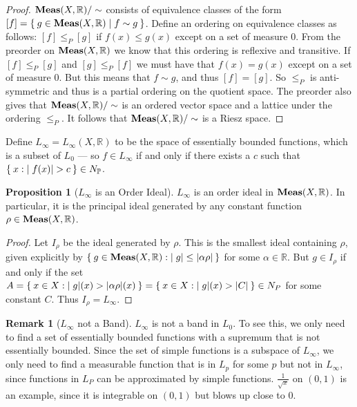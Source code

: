 \documentclass[letterpaper,10pt,oneside,onecolumn,reqno]{amsart}
\renewcommand{\P}{\mathbb P}
\newcommand{\R}{\mathbb R}
\theoremstyle{definition}
\newtheorem{pro}[thm]{Proposition}
\newtheorem{rem}{Remark}
\newcommand{\catname}[1]{{\normalfont\textbf{#1}}}
\newcommand{\Meas}{\catname{Meas}}
\begin{document}
\begin{proof}
  $\Meas(X, \R)/\sim$ consists of equivalence classes of the form $[f]
  = \Set{g \in \Meas(X, \R) | f \sim g }$. Define an ordering on
  equivalence classes as follows: $[f] \leq_P [g]$ if $f(x) \leq g(x)$
  except on a set of measure $0$. From the preorder on $\Meas(X,\R)$
  we know that this ordering is reflexive and transitive.  If $[f]
  \leq_P [g]$ and $[g] \leq_P [f]$ we must have that $f(x) = g(x)$
  except on a set of measure $0$. But this means that $f \sim g$, and
  thus $[f] = [g]$. So $\leq_P$ is anti-symmetric and thus is a
  partial ordering on the quotient space. The preorder also gives that
  $\Meas(X,\R)/\sim$ is an ordered vector space and a lattice under
  the ordering $\leq_P$. It follows that $\Meas(X,\R)/\sim$ is a Riesz
  space.
\end{proof}

Define $L_{\infty}=L_{\infty}(X,\R)$ to be the space of essentially
bounded functions, which is a subset of $L_0$ --- so $f \in
L_{\infty}$ if and only if there exists a $c$ such that $\Set{x :
  |f(x)| > c} \in N_{\P}$.

\begin{pro}[$L_{\infty}$ is an Order Ideal]\label{pro:4}
  $L_{\infty}$ is an order ideal in $\Meas(X,\R)$. In particular, it
  is the principal ideal generated by any constant function $\rho \in
  \Meas(X,\R)$.
\end{pro}

\begin{proof}
  Let $I_{\rho}$ be the ideal generated by $\rho$. This is the
  smallest ideal containing $\rho$, given explicitly by $\Set{g \in
    \Meas(X, \R) : |g| \leq |\alpha \rho|}$ for some $\alpha \in
  \R$. But $g \in I_{\rho}$ if and only if the set $A = \Set{x \in X :
    |g|(x) > |\alpha \rho|(x)} = \Set{x \in X : |g|(x) > |C|} \in N_P$
  for some constant $C$. Thus $I_{\rho} = L_{\infty}$.
\end{proof}

\begin{rem}[$L_{\infty}$ not a Band]\label{rem:5}
  $L_{\infty}$ is not a band in $L_0$. To see this, we only need to
  find a set of essentially bounded functions with a supremum that is
  not essentially bounded. Since the set of simple functions is a
  subspace of $L_{\infty}$, we only need to find a measurable function
  that is in $L_p$ for some $p$ but not in $L_{\infty}$, since
  functions in $L_P$ can be approximated by simple
  functions. $\frac{1}{\sqrt{x}}$ on $(0,1)$ is an example, since it
  is integrable on $(0,1)$ but blows up close to $0$.
\end{rem}
\end{document}
